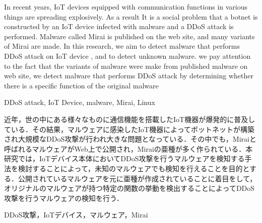 \maketitle    %
\begin{eabstract}
{In recent years, IoT devices equipped with communication functions in various things are spreading explosively. As a result It is a social problem that a botnet is constructed by an IoT device infected with malware and a DDoS attack is performed. Malware called Mirai is published on the web site, and many variants of Mirai are made. In this research, we aim to detect malware that performs DDoS attack on IoT device , and to detect unknown malware. we pay attention to the fact that the variants of malware were make from published malware on web site, we detect malware that performs DDoS attack by determining whether there is a specific function of the original malware}
\end{eabstract}

\begin{ekeyword}
DDoS attack, IoT Device, malware, Mirai, Linux
\end{ekeyword}

\begin{jabstract}
近年，世の中にある様々なものに通信機能を搭載したIoT機器が爆発的に普及している．その結果，マルウェアに感染したIoT機器によってボットネットが構築され大規模なDDoS攻撃が行われ大きな問題となっている．その中でも，Miraiと呼ばれるマルウェアがWeb上で公開され，Miraiの亜種が多く作られている．本研究では，IoTデバイス本体においてDDoS攻撃を行うマルウェアを検知する手法を検討することによって，未知のマルウェアでも検知を行えることを目的とする．公開されているマルウェアを元に亜種が作成されていることに着目をして，オリジナルのマルウェアが持つ特定の関数の挙動を検出することによってDDoS攻撃を行うマルウェアの検知を行う．
\end{jabstract}

\begin{jkeyword}
DDoS攻撃，IoTデバイス，マルウェア，Mirai
\end{jkeyword}
\tableofcontents %
